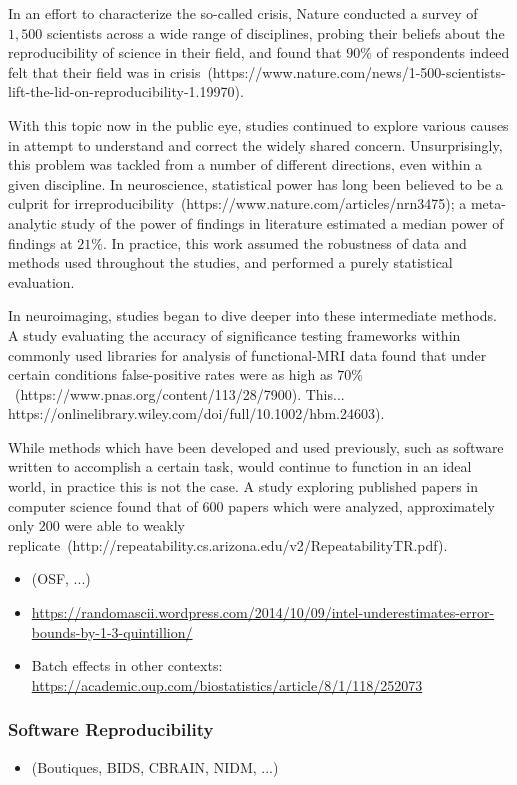 In an effort to characterize the so-called crisis, Nature conducted a survey of $1,500$ scientists across a wide
range of disciplines, probing their beliefs about the reproducibility of science in their field, and found that $90\%$
of respondents indeed felt that their field was in crisis~\tocite (https://www.nature.com/news/1-500-scientists-lift-the-lid-on-reproducibility-1.19970).

With this topic now in the public eye, studies continued to explore various causes in attempt to understand and correct
the widely shared concern. Unsurprisingly, this problem was tackled from a number of different directions, even within
a given discipline. In neuroscience, statistical power has long been believed to be a
culprit for irreproducibility~\tocite (https://www.nature.com/articles/nrn3475); a meta-analytic study of the power of
findings in literature estimated a median power of findings at $21\%$. In practice, this work assumed the robustness of
data and methods used throughout the studies, and performed a purely statistical evaluation.

In neuroimaging, studies began to dive deeper into these intermediate methods. A study evaluating the accuracy of
significance testing frameworks within commonly used libraries for analysis of functional-MRI data found that
under certain conditions false-positive rates were as high as $70\%$~\tocite (https://www.pnas.org/content/113/28/7900).
This... https://onlinelibrary.wiley.com/doi/full/10.1002/hbm.24603).



While methods which have been developed and used previously, such as software written to accomplish a certain task,
would continue to function in an ideal world, in practice this is not the case. A study exploring published papers in
computer science found that of $600$ papers which were analyzed, approximately only $200$ were able to weakly
replicate~\tocite (http://repeatability.cs.arizona.edu/v2/RepeatabilityTR.pdf).

\begin{itemize}
\item (OSF,  ...)
\item \url{https://randomascii.wordpress.com/2014/10/09/intel-underestimates-error-bounds-by-1-3-quintillion/}
\item Batch effects in other contexts: \url{https://academic.oup.com/biostatistics/article/8/1/118/252073}
\end{itemize}

\subsubsection{Software Reproducibility}
\begin{itemize}
\item (Boutiques, BIDS, CBRAIN, NIDM, ...)
\end{itemize}


